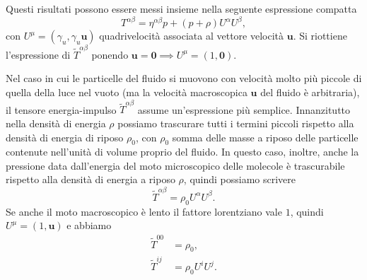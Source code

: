 Questi risultati possono essere messi insieme nella seguente espressione
compatta
\begin{equation}
  T^{\alpha\beta} = \eta^{\alpha\beta}p + (p + \rho)U^{\alpha}U^{\beta},
\end{equation}
con $U^{\mu} = (\gamma_{u}, \gamma_{u} \bm{u})$ quadrivelocità associata al
vettore velocità $\bm{u}$.  Si riottiene l'espressione di
$\tilde T^{\alpha\beta}$ ponendo
$\bm{u} = \bm{0} \implies U^{\mu} = (1, \bm{0})$.

Nel caso in cui le particelle del fluido si muovono con velocità molto più
piccole di quella della luce nel vuoto (ma la velocità macroscopica $\bm{u}$ del
fluido è arbitraria), il tensore energia-impulso $\tilde T^{\alpha\beta}$ assume
un'espressione più semplice.  Innanzitutto nella densità di energia $\rho$
possiamo trascurare tutti i termini piccoli rispetto alla densità di energia di
riposo $\rho_{0}$, con $\rho_{0}$ somma delle masse a riposo delle particelle
contenute nell'unità di volume proprio del fluido.  In questo caso, inoltre,
anche la pressione data dall'energia del moto microscopico delle molecole è
trascurabile rispetto alla densità di energia a riposo $\rho$, quindi possiamo
scrivere
\begin{equation}
  \tilde T^{\alpha\beta} = \rho_{0} U^{\alpha} U^{\beta}.
\end{equation}
Se anche il moto macroscopico è lento il fattore lorentziano vale $1$, quindi
$U^{\mu}= (1, \bm{u})$ e abbiamo
\begin{subequations}
  \begin{align}
    \tilde T^{00} &= \rho_{0}, \\
    \tilde T^{ij} &= \rho_{0} U^{i} U^{j}.
  \end{align}
\end{subequations}


